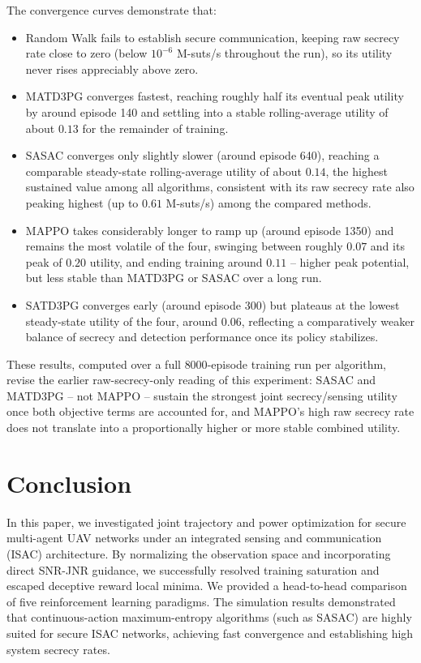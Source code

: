 \documentclass[journal,onecolumn]{IEEEtran}
\begin{document}
The convergence curves demonstrate that:
\begin{itemize}
    \item Random Walk fails to establish secure communication, keeping raw secrecy rate close to zero (below $10^{-6}$ M-suts/s throughout the run), so its utility never rises appreciably above zero.
    \item MATD3PG converges fastest, reaching roughly half its eventual peak utility by around episode 140 and settling into a stable rolling-average utility of about $0.13$ for the remainder of training.
    \item SASAC converges only slightly slower (around episode 640), reaching a comparable steady-state rolling-average utility of about $0.14$, the highest sustained value among all algorithms, consistent with its raw secrecy rate also peaking highest (up to $0.61$ M-suts/s) among the compared methods.
    \item MAPPO takes considerably longer to ramp up (around episode 1350) and remains the most volatile of the four, swinging between roughly $0.07$ and its peak of $0.20$ utility, and ending training around $0.11$ -- higher peak potential, but less stable than MATD3PG or SASAC over a long run.
    \item SATD3PG converges early (around episode 300) but plateaus at the lowest steady-state utility of the four, around $0.06$, reflecting a comparatively weaker balance of secrecy and detection performance once its policy stabilizes.
\end{itemize}
These results, computed over a full $8000$-episode training run per algorithm, revise the earlier raw-secrecy-only reading of this experiment: SASAC and MATD3PG -- not MAPPO -- sustain the strongest joint secrecy/sensing utility once both objective terms are accounted for, and MAPPO's high raw secrecy rate does not translate into a proportionally higher or more stable combined utility.

\section{Conclusion}
In this paper, we investigated joint trajectory and power optimization for secure multi-agent UAV networks under an integrated sensing and communication (ISAC) architecture. By normalizing the observation space and incorporating direct SNR-JNR guidance, we successfully resolved training saturation and escaped deceptive reward local minima. We provided a head-to-head comparison of five reinforcement learning paradigms. The simulation results demonstrated that continuous-action maximum-entropy algorithms (such as SASAC) are highly suited for secure ISAC networks, achieving fast convergence and establishing high system secrecy rates.
\end{document}
